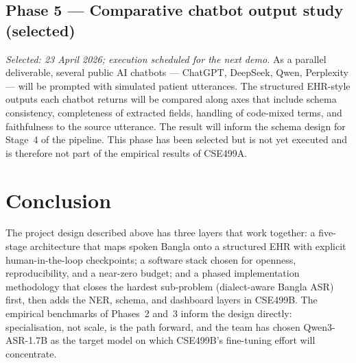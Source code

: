 \documentclass[12pt,a4paper]{article}
\begin{document}
\subsection*{Phase 5 --- Comparative chatbot output study (selected)}
\textit{Selected: 23 April 2026; execution scheduled for the next demo.}
As a parallel deliverable, several public AI chatbots --- ChatGPT,
DeepSeek, Qwen, Perplexity --- will be prompted with simulated
patient utterances. The structured EHR-style outputs each chatbot
returns will be compared along axes that include schema
consistency, completeness of extracted fields, handling of
code-mixed terms, and faithfulness to the source utterance. The
result will inform the schema design for Stage~4 of the pipeline.
This phase has been selected but is not yet executed and is
therefore not part of the empirical results of CSE499A.

\section{Conclusion}

The project design described above has three layers that work
together: a five-stage architecture that maps spoken Bangla onto a
structured EHR with explicit human-in-the-loop checkpoints; a
software stack chosen for openness, reproducibility, and a near-zero
budget; and a phased implementation methodology that closes the
hardest sub-problem (dialect-aware Bangla ASR) first, then adds the
NER, schema, and dashboard layers in CSE499B. The empirical
benchmarks of Phases~2 and~3 inform the design directly:
specialisation, not scale, is the path forward, and the team has
chosen Qwen3-ASR-1.7B as the target model on which CSE499B's
fine-tuning effort will concentrate.
\end{document}
